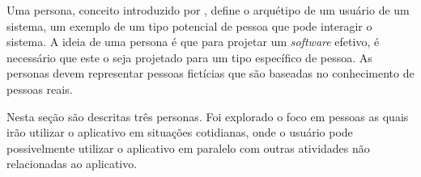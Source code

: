 

Uma persona, conceito introduzido por , define o 
arquétipo de um usuário de um sistema, um exemplo de um tipo potencial
de pessoa que pode interagir o sistema.  A ideia de uma persona é que
para projetar um \emph{software} efetivo, é necessário que este o seja
projetado para um tipo específico de pessoa.  As personas devem 
representar pessoas fictícias que são baseadas no conhecimento de
pessoas reais.

Nesta seção são descritas três personas.  Foi explorado o foco em pessoas
as quais irão utilizar o aplicativo em situações cotidianas, onde o usuário
pode possivelmente utilizar o aplicativo em paralelo com outras atividades
não relacionadas ao aplicativo.


